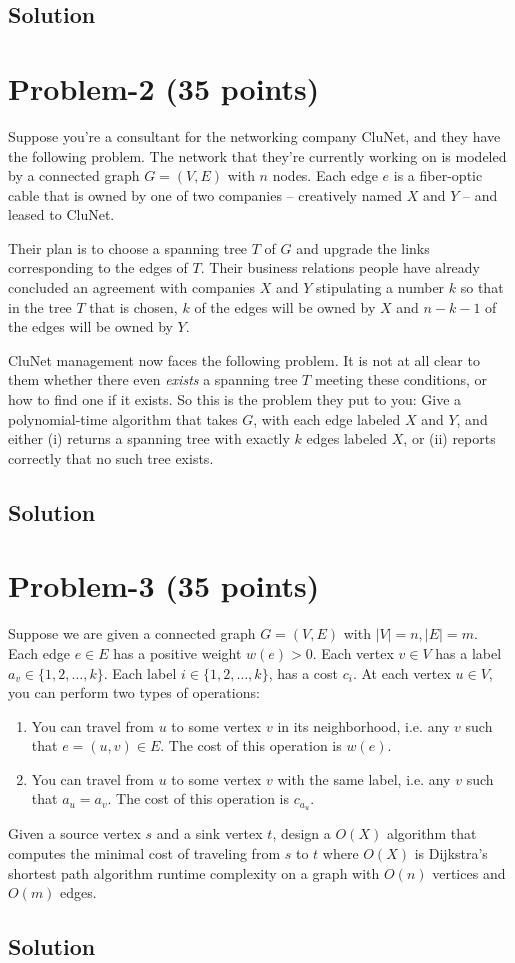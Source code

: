 \documentclass[11pt]{article}
\begin{document}
\subsection*{Solution}


\newpage
\section*{Problem-2 (35 points)}

Suppose you're a consultant for the networking company CluNet, and they have the following problem. The network that they're currently working on is modeled by a connected graph $G = (V, E)$ with $n$ nodes. Each edge $e$ is a fiber-optic cable that is owned by one of two companies -- creatively named $X$ and $Y$ -- and leased to CluNet.

Their plan is to choose a spanning tree $T$ of $G$ and upgrade the links corresponding to the edges of $T$. Their business relations people have already concluded an agreement with companies $X$ and $Y$ stipulating a number $k$ so that in the tree $T$ that is chosen, $k$ of the edges will be owned by $X$ and $n-k-1$ of the edges will be owned by $Y$.

CluNet management now faces the following problem. It is not at all clear to them whether there even \textit{exists} a spanning tree $T$ meeting these conditions, or how to find one if it exists. So this is the problem they put to you: Give a polynomial-time algorithm that takes $G$, with each edge labeled $X$ and $Y$, and either (i) returns a spanning tree with exactly $k$ edges labeled $X$, or (ii) reports correctly that no such tree exists.

\subsection*{Solution}


\newpage
\section*{Problem-3 (35 points)}
Suppose we are given a connected graph $G = (V, E)$ with $|V| = n, |E| = m$. Each edge $e \in E$ has a positive weight $w(e) > 0$. Each vertex $v \in V$ has a label $a_v \in \{1, 2, \ldots, k\}$. Each label $i \in \{1, 2, \ldots, k\}$, has a cost $c_i$. At each vertex $u \in V$, you can perform two types of operations:
\begin{enumerate}
    \item You can travel from $u$ to some vertex $v$ in its neighborhood, i.e. any $v$ such that $e = (u,v) \in E$. The cost of this operation is $w(e)$.
    \item You can travel from $u$ to some vertex $v$ with the same label, i.e. any $v$ such that $a_u = a_v$. The cost of this operation is $c_{a_u}$.
\end{enumerate}

Given a source vertex $s$ and a sink vertex $t$, design a $O(X)$ algorithm that computes the minimal cost of traveling from $s$ to $t$ where $O(X)$ is Dijkstra’s shortest path algorithm runtime complexity on a graph with $O(n)$ vertices and $O(m)$ edges.

\subsection*{Solution}
\end{document}
